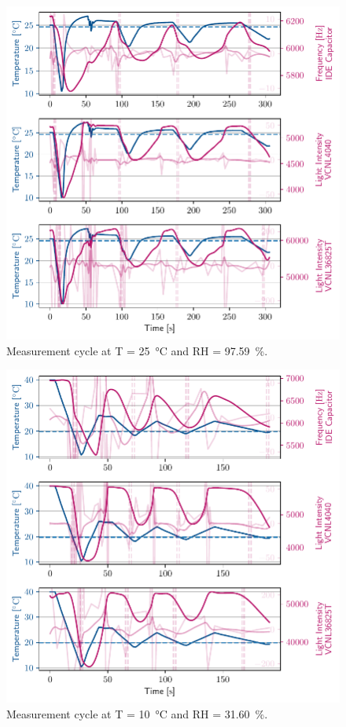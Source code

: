 \begin{figure}[ht]
    \centering
    \includegraphics{graphs/t25rh97.6.pdf}
    \caption{Measurement cycle at T = \qty{25}{\celsius} and RH = \qty{97.59}{\percent}.}
    
\end{figure}

\begin{figure}[ht]
    \centering
    \includegraphics{graphs/t40rh31.6.pdf}
    \caption{Measurement cycle at T = \qty{10}{\celsius} and RH = \qty{31.60}{\percent}.}
    
\end{figure}

